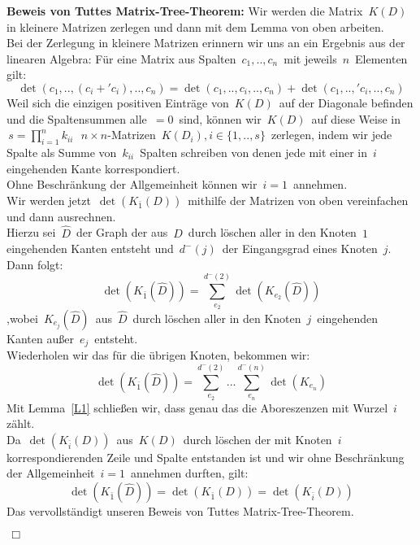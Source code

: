 \textbf{Beweis von Tuttes Matrix-Tree-Theorem:}
Wir werden die Matrix $\,K(D)\,$ in kleinere Matrizen zerlegen und dann mit dem Lemma von oben arbeiten.\\
Bei der Zerlegung in kleinere Matrizen erinnern wir uns an ein Ergebnis aus der linearen Algebra:
Für eine Matrix aus Spalten $\,c_1,..,c_n\,$ mit jeweils $\,n\,$ Elementen gilt:
\begin{equation*}
 \det(c_1,..,(c_i+\prime{c_i}),..,c_n) = \det(c_1,..,c_i,..,c_n) + \det(c_1,..,\prime{c_i},..,c_n)
\end{equation*}
Weil sich die einzigen positiven Einträge von $\,K(D)\,$ auf der Diagonale befinden und die Spaltensummen alle $\,=0\,$ sind, können wir $\,K(D)\,$ auf diese Weise in  $\,s=\prod_{i=1}^nk_{ii}\,$ $\,n \times n$-Matrizen $\,K(D_i), i\in\{1,..,s\}\,$ zerlegen, indem wir jede Spalte als Summe von $\,k_{ii}\,$ Spalten schreiben von denen jede mit einer in $\,i\,$ eingehenden Kante korrespondiert.\\
Ohne Beschränkung der Allgemeinheit können wir $\,i=1\,$ annehmen.\\
Wir werden jetzt $\,\det(K_{\bar{1}}(D))\,$ mithilfe der Matrizen von oben vereinfachen und dann ausrechnen.\\
Hierzu sei $\,\hat{D}\,$ der Graph der aus $\,D\,$ durch löschen aller in den Knoten $\,1\,$ eingehenden Kanten entsteht und $\,d^{-}(j)\,$ der Eingangsgrad eines Knoten $\,j$.\;  Dann folgt:
\begin{equation*}
 \det(K_{\bar{1}}(\hat{D})) = \sum_{e_2}^{d^{-}(2)}\det(K_{e_2}(\hat{D}))
\end{equation*}
,wobei $\,K_{e_j}(\hat{D})\,$ aus $\,\hat{D}\,$ durch löschen aller in den Knoten $\,j\,$ eingehenden Kanten außer $\,e_j\,$ entsteht.\\
Wiederholen wir das für die übrigen Knoten, bekommen wir:
\begin{equation*}
  \det(K_{\bar{1}}(\hat{D})) = \sum_{e_2}^{d^{-}(2)}...\sum_{e_n}^{d^{-}(n)}\det(K_{e_n})
\end{equation*}
Mit Lemma~\ref{L1} schließen wir, dass genau das die Aboreszenzen mit Wurzel $\,i\,$ zählt.\\
Da $\,\det(K_{\bar{i}}(D))\,$ aus $\,K(D)\,$ durch löschen der mit Knoten $\,i\,$ korrespondierenden Zeile und Spalte entstanden ist und wir ohne Beschränkung der Allgemeinheit $\,i=1\,$ annehmen durften, gilt:
\begin{equation*}
 \det(K_{\bar{1}}(\hat{D}))=\det(K_{\bar{1}}(D))=\det(K_{\bar{i}}(D))
\end{equation*}
Das vervollständigt unseren Beweis von Tuttes Matrix-Tree-Theorem.
\begin{flushright} $\,\Box\,$ \end{flushright} 

